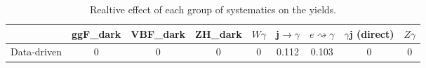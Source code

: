 \documentclass[10pt]{article}
\begin{document}
\begin{table}[htbp]
\begin{center}
\begin{tabular}{|c|c|c|c|c|c|c|c|c|}
\hline 
      & ggF_{dark}      & VBF_{dark}      & ZH_{dark}      & $W\gamma$      & j$\rightarrow\gamma$      & $e\rightsquigarrow\gamma$      & $\gamma$j (direct)      & $Z\gamma$ \\ 
\hline 
 Data-driven & 0 & 0 & 0 & 0 & 0.112 & 0.103 & 0 & 0 \\ 
\hline 
\end{tabular} 
\caption{Realtive effect of each group of systematics on the yields.} 
\end{center} 
\end{table} 
\end{document}
